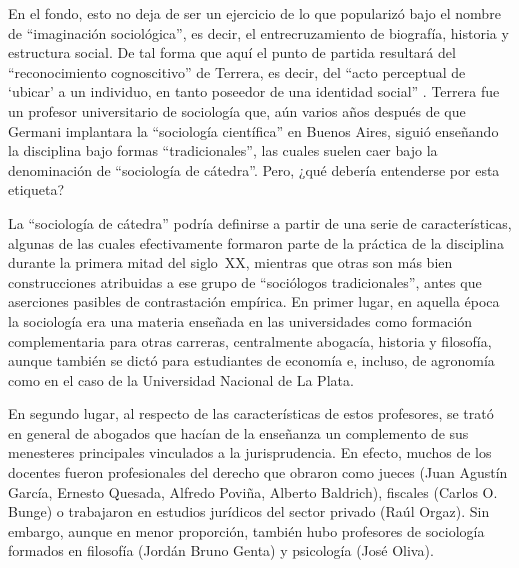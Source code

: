 En el fondo, esto no deja de ser un ejercicio de lo que \textcite{1451-WRIGHTMILLS1956} popularizó bajo el nombre de \enquote{imaginación sociológica}, es decir, el entrecruzamiento de biografía, historia y estructura social. De tal forma que aquí el punto de partida resultará del \enquote{reconocimiento cognoscitivo} de Terrera, es decir, del \enquote{acto perceptual de \enquote{ubicar} a un individuo, en tanto poseedor de una identidad social} \parencite[91]{1678-GOFFMANN2010}. Terrera fue un profesor universitario de sociología que, aún varios años después de que Germani implantara la \enquote{sociología científica} en Buenos Aires, siguió enseñando la disciplina bajo formas \enquote{tradicionales}, las cuales suelen caer bajo la denominación de \enquote{sociología de cátedra}. Pero, ¿qué debería entenderse por esta etiqueta?

La \enquote{sociología de cátedra} podría definirse a partir de una serie de características, algunas de las cuales efectivamente formaron parte de la práctica de la disciplina durante la primera mitad del siglo~XX, mientras que otras son más bien construcciones atribuidas a ese grupo de \enquote{sociólogos tradicionales}, antes que aserciones pasibles de contrastación empírica. En primer lugar, en aquella época la sociología era una materia enseñada en las universidades como formación complementaria para otras carreras, centralmente abogacía, historia y filosofía, aunque también se dictó para estudiantes de economía e, incluso, de agronomía como en el caso de la Universidad Nacional de La Plata.

En segundo lugar, al respecto de las características de estos profesores, se trató en general de abogados que hacían de la enseñanza un complemento de sus menesteres principales vinculados a la jurisprudencia. En efecto, muchos de los docentes fueron profesionales del derecho que obraron como jueces (Juan Agustín García, Ernesto Quesada, Alfredo Poviña, Alberto Baldrich), fiscales (Carlos O. Bunge) o trabajaron en estudios jurídicos del sector privado (Raúl Orgaz). Sin embargo, aunque en menor proporción, también hubo profesores de sociología formados en filosofía (Jordán Bruno Genta) y psicología (José Oliva).

